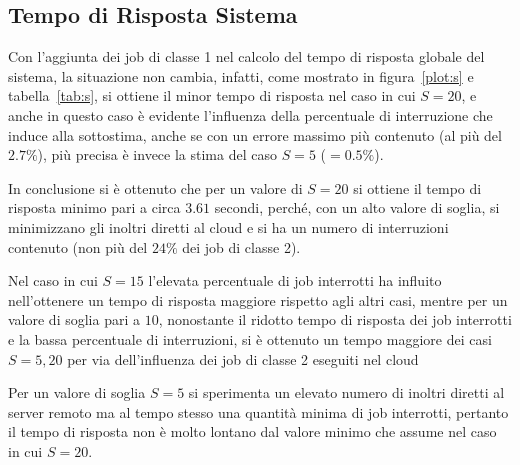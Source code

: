 \subsection{Tempo di Risposta Sistema}
Con l'aggiunta dei job di classe 1 nel calcolo del tempo di risposta globale del
sistema, la situazione non cambia, infatti, come mostrato in 
figura~\ref{plot:s} e tabella~\ref{tab:s}, si ottiene il minor tempo di risposta
nel caso in cui $S=20$, e anche in questo caso è evidente l'influenza della
percentuale di interruzione che induce alla sottostima, anche se con un errore
massimo più contenuto (al più del $2.7\%$), più precisa è invece la stima
del caso $S=5$ (\epsmx$=0.5\%$).

In conclusione si è ottenuto che per un valore di $S=20$ si ottiene il
tempo di risposta minimo pari a circa $3.61$ secondi, perché, con un alto
valore di soglia, si minimizzano gli inoltri diretti al cloud e si ha un numero
di interruzioni contenuto (non più del $24\%$ dei job di classe 2).

Nel caso in cui $S=15$ l'elevata percentuale di job interrotti ha influito
nell'ottenere un tempo di risposta maggiore rispetto agli altri casi, mentre per
un valore di soglia pari a $10$, nonostante il ridotto tempo di risposta dei job
interrotti e la bassa percentuale di interruzioni, si è ottenuto un tempo
maggiore dei casi $S=5,20$ per via dell'influenza dei job di classe 2 eseguiti
nel cloud

Per un valore di soglia $S=5$ si sperimenta un
elevato numero di inoltri diretti al server remoto ma al tempo stesso una
quantità minima di job interrotti, pertanto il tempo di risposta non è molto
lontano dal valore minimo che assume nel caso in cui $S=20$.

